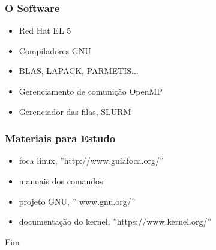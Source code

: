 \documentclass{beamer}
\begin{document}
\begin{frame}
    \frametitle{O Software}
    \begin{itemize}
        \item Red Hat EL 5
        \item Compiladores GNU
        \item BLAS, LAPACK, PARMETIS...
        \item Gerenciamento de comunição OpenMP
        \item Gerenciador das filas, SLURM
    \end{itemize}
\end{frame}

\begin{frame}
    \frametitle{Materiais para Estudo}

    \begin{itemize}
        \item foca linux, ''http://www.guiafoca.org/'' 
        \item manuais dos comandos
        \item projeto GNU, '' www.gnu.org/''
        \item documentação do kernel, ''https://www.kernel.org/''
    \end{itemize}
\end{frame}

\begin{frame}
\Huge{\centerline{Fim}}
\end{frame}
\end{document}
